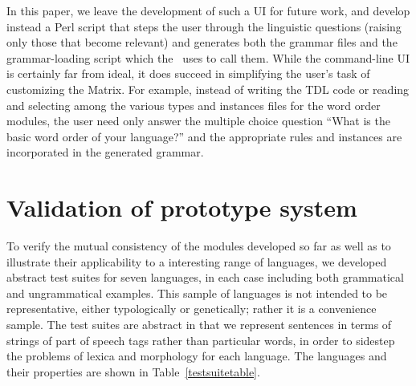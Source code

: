 In this paper, we leave the development of such a UI for future work,
and develop instead a Perl script that steps the user through the
linguistic questions (raising only those that become relevant) and
generates both the grammar files and the grammar-loading script which
the \lkb\ uses to call them.  While the command-line UI is certainly far
from ideal, it does succeed in simplifying the user's task of
customizing the Matrix.
For example, instead of writing the TDL code or reading and
selecting among the various types and instances files for the word
order modules, the user need only answer the multiple choice question
``What is the basic word order of your language?'' and the appropriate
rules and instances are incorporated in the generated grammar.


\section{Validation of prototype system}

To verify the mutual consistency of the modules developed so far as
well as to illustrate their applicability to a interesting range of
languages, we developed abstract test suites for seven languages, in
each case including both grammatical and ungrammatical examples.  This
sample of languages is not intended to be representative, either
typologically or genetically; rather it is a convenience sample.  The
test suites are abstract in that we represent sentences in terms of
strings of part of speech tags rather than particular words, in order
to sidestep the problems of lexica and morphology for each language.
The languages and their properties are shown in
Table~\ref{testsuitetable}.

